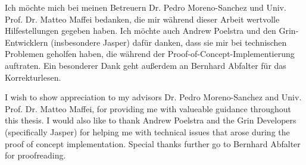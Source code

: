 \documentclass[draft,final]{vutinfth} %
\theoremstyle{definition}
\begin{document}
\frontmatter %

\addstatementpage

\begin{danksagung*}
Ich möchte mich bei meinen Betreuern Dr. Pedro Moreno-Sanchez und Univ. Prof. Dr. Matteo Maffei bedanken, die mir während dieser Arbeit wertvolle Hilfestellungen gegeben haben.
Ich möchte auch Andrew Poelstra und den Grin-Entwicklern (insbesondere Jasper) dafür danken, dass sie mir bei technischen Problemen geholfen haben, die während der Proof-of-Concept-Implementierung auftraten.
Ein besonderer Dank geht außerdem an Bernhard Abfalter für das Korrekturlesen.
\end{danksagung*}

\begin{acknowledgements*}
    I wish to show appreciation to my advisors Dr. Pedro Moreno-Sanchez and Univ. Prof. Dr. Matteo Maffei, for providing me with valueable guidance throughout this thesis.
    I would also like to thank Andrew Poelstra and the Grin Developers (specifically Jasper) for helping me with technical issues that arose during the proof of concept implementation.
    Special thanks further go to Bernhard Abfalter for proofreading.
\end{acknowledgements*}
\end{document}
